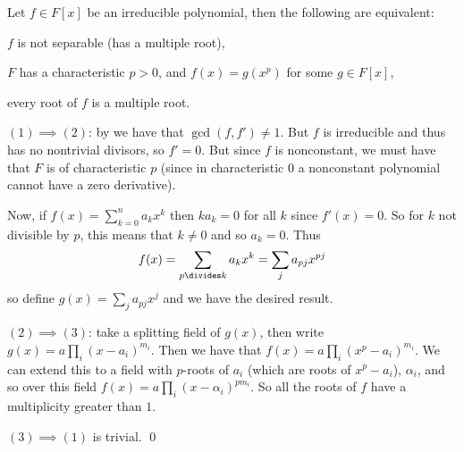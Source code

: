 \bthrm

    Let $f\in F[x]$ be an irreducible polynomial, then the following are equivalent:
    \benum
        \item $f$ is not separable (has a multiple root),
        \item $F$ has a characteristic $p>0$, and $f(x)=g(x^p)$ for some $g\in F[x]$,
        \item every root of $f$ is a multiple root.
    \eenum

\ethrm

\Proof $(1)\implies(2)$: by  we have that $\gcd(f,f')\neq1$.
But $f$ is irreducible and thus has no nontrivial divisors, so $f'=0$.
But since $f$ is nonconstant, we must have that $F$ is of characteristic $p$ (since in characteristic $0$ a nonconstant polynomial cannot have a zero derivative).

Now, if $f(x)=\sum_{k=0}^na_kx^k$ then $ka_k=0$ for all $k$ since $f'(x)=0$.
So for $k$ not divisible by $p$, this means that $k\neq0$ and so $a_k=0$.
Thus
$$ f(x) = \sum_{p\divides k}a_kx^k = \sum_ja_{pj}x^{pj} $$
so define $g(x)=\sum_ja_{pj}x^j$ and we have the desired result.

$(2)\implies(3)$: take a splitting field of $g(x)$, then write $g(x) = a\prod_i(x-a_i)^{m_i}$.
Then we have that $f(x)=a\prod_i(x^p-a_i)^{m_i}$.
We can extend this to a field with $p$-roots of $a_i$ (which are roots of $x^p-a_i$), $\alpha_i$, and so over this field $f(x)=a\prod_i(x-\alpha_i)^{pm_i}$.
So all the roots of $f$ have a multiplicity greater than $1$.

$(3)\implies(1)$ is trivial.
\qed

